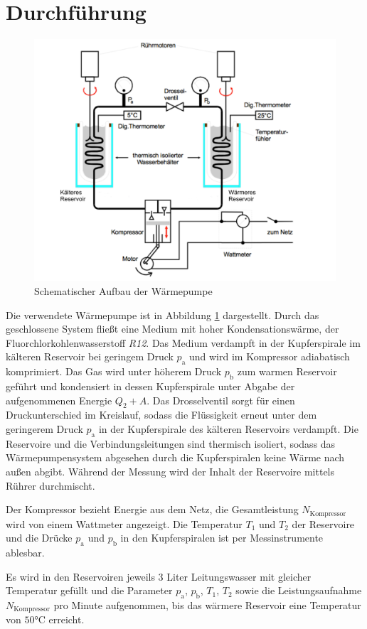 \section{Durchführung}
\label{sec:Durchfuehrung}
\begin{figure}
	\includegraphics[width=\textwidth]{Bilder/Abbildung.pdf}
	\caption{Schematischer Aufbau der Wärmepumpe \cite{V206} \cite{gimp}}
	\label{fig:pumpe}
\end{figure}
Die verwendete Wärmepumpe ist in Abbildung \ref{fig:pumpe} dargestellt.
Durch das geschlossene System fließt eine Medium mit hoher Kondensationswärme, der Fluorchlorkohlenwasserstoff \textit{R12}.
Das Medium verdampft in der Kupferspirale im kälteren Reservoir bei geringem Druck $p_\text{a}$ und wird im Kompressor adiabatisch komprimiert. 
Das Gas wird unter höherem Druck $p_\text{b}$ zum warmen Reservoir geführt und kondensiert in dessen Kupferspirale unter Abgabe der aufgenommenen Energie $Q_2+A$.
Das Drosselventil sorgt für einen Druckunterschied im Kreislauf, sodass die Flüssigkeit erneut unter dem geringerem Druck $p_\text{a}$ in der Kupferspirale des kälteren Reservoirs verdampft. 
Die Reservoire und die Verbindungsleitungen sind thermisch isoliert, sodass das Wärmepumpensystem abgesehen durch die Kupferspiralen keine Wärme nach außen abgibt.
Während der Messung wird der Inhalt der Reservoire mittels Rührer durchmischt.

Der Kompressor bezieht Energie aus dem Netz, die Gesamtleistung $N_\text{Kompressor}$ wird von einem Wattmeter angezeigt. 
Die Temperatur $T_1$ und $T_2$ der Reservoire und die Drücke $p_\text{a}$ und $p_\text{b}$ in den Kupferspiralen ist per Messinstrumente ablesbar.

Es wird in den Reservoiren jeweils 3 Liter Leitungswasser mit gleicher Temperatur gefüllt und die Parameter $p_\text{a}$, $p_\text{b}$, $T_1$, $T_2$ sowie die Leistungsaufnahme $N_\text{Kompressor}$ pro Minute aufgenommen, bis das wärmere Reservoir eine Temperatur von $50\si{\degreeCelsius}$ erreicht.